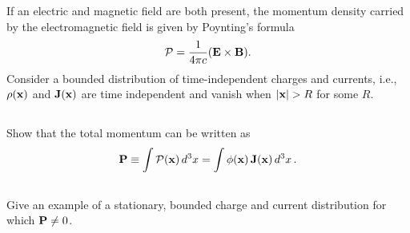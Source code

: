 \documentclass[11pt]{article}
\newcommand{\beq}{\begin{equation*}}
\newcommand{\eeq}{\end{equation*}}
\newenvironment{statement}[1]
{
	\section{#1}
	\color{darkgray}
	\ignorespaces
}
{
}
\newenvironment{problem}
{
	\subsection{}
	\color{darkgray}
    \ignorespaces
}
{

}
\begin{document}
\newcommand{\alp}{\alpha}
\newcommand{\tht}{\theta}
\newcommand{\vph}{\varphi}
\newcommand{\omg}{\omega}

\newcommand{\vA}{\vb{A}}
\newcommand{\vB}{\vb{B}}
\newcommand{\vE}{\vb{E}}
\newcommand{\vJ}{\vb{J}}
\newcommand{\vP}{\vb{P}}
\newcommand{\vv}{\vb{v}}
\newcommand{\vx}{\vb{x}}
\newcommand{\vomg}{\boldsymbol{\omg}}
\newcommand{\rh}{\vb{\hat{r}}}
\newcommand{\phh}{\boldsymbol{\hat{\vph}}}
\newcommand{\thh}{\boldsymbol{\hat{\tht}}}

\newcommand{\vAx}{\vA(\vx)}
\newcommand{\vBx}{\vB(\vx)}
\newcommand{\vJx}{\vJ(\vx)}
\newcommand{\vvx}{\vv(\vx)}

\newcommand{\rhox}{\rho(\vx)}
\newcommand{\absx}{\abs{\vx}}
\newcommand{\dcxp}{\dd[3]{\vx'}}

\newcommand{\xh}{\vb{\hat{x}}}
\newcommand{\yh}{\vb{\hat{y}}}
\newcommand{\zh}{\vb{\hat{z}}}
\newcommand{\omgh}{\boldsymbol{\hat{\omg}}}

\newcommand{\intotp}{\int_0^{2\pi}}
\newcommand{\intono}{\int_{-1}^1}
\newcommand{\intoi}{\int_0^\infty}
\newcommand{\drp}{\dd{r'}}
\newcommand{\dctp}{\dd{(\cos\tht')}}
\newcommand{\dvp}{\dd{\vph}}





\newcommand{\cP}{\mathcal{P}}
\newcommand{\vcP}{\vb{\cP}}
\newcommand{\vcPx}{\vcP(\vx)}
\newcommand{\dcx}{\dd[3]{x}}
\newcommand{\phix}{\phi(\vx)}

\begin{statement}{}
	If an electric and magnetic field are both present, the momentum density carried by the electromagnetic field is given by Poynting's formula
	\beq
		\vcP = \frac{1}{4\pi c} (\vE \times \vB).
	\eeq
	Consider a bounded distribution of time-independent charges and currents, i.e., $\rhox$ and $\vJx$ are time independent and vanish when $\absx > R$ for some $R$.
\end{statement}

\begin{problem}
	Show that the total momentum can be written as
	\beq
		\vP \equiv \int \vcPx \dcx
		= \int \phix \, \vJx \dcx.
	\eeq
\end{problem}

\begin{problem}
	Give an example of a stationary, bounded charge and current distribution for which $\vP \neq 0$.
\end{problem}



\newcommand{\vl}{\vb{l}}
\newcommand{\vL}{\vb{L}}
\end{document}
